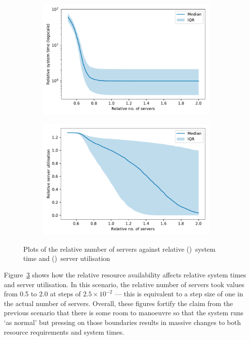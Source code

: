 \begin{figure}
    \centering
    \begin{subfigure}{\imgwidth}
        \includegraphics[width=\linewidth]{servers_time}
        \caption{}\label{fig:servers_time}
    \end{subfigure}

    \begin{subfigure}{\imgwidth}
        \includegraphics[width=\linewidth]{servers_util}
        \caption{}\label{fig:servers_util}
    \end{subfigure}
    \caption{%
        Plots of the relative number of servers against relative
        ()~system time and
        ()~server utilisation
    }\label{fig:servers}
\end{figure}

Figure~\ref{fig:servers} shows how the relative resource availability affects
relative system times and server utilisation. In this scenario, the relative
number of servers took values from 0.5 to 2.0 at steps of \(2.5 \times 10^{-2}\)
--- this is equivalent to a step size of one in the actual number of servers.
Overall, these figures fortify the claim from the previous scenario that there
is some room to manoeuvre so that the system runs `as normal' but pressing on
those boundaries results in massive changes to both resource requirements and
system times.

